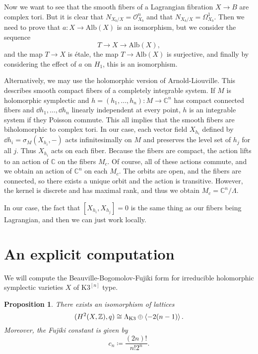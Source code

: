 \documentclass[leqno, openany]{memoir}
\newtheorem{prop}[thm]{Proposition}
\theoremstyle{definition}
\theoremstyle{remark}
\theoremstyle{plain}
\theoremstyle{definition}
\theoremstyle{remark}
\newcommand{\C}{\mathbb{C}}
\newcommand{\Z}{\mathbb{Z}}
\newcommand{\mc}[1]{\mathcal{#1}}
\newcommand{\mr}[1]{\mathrm{#1}}
\begin{document}
Now we want to see that the smooth fibers of a Lagrangian fibration $X \to B$ are complex tori. But it is clear that $N_{X_b/X} = \mc{O}_{X_b}^n$ and that $N_{X_b/X} = \Omega^1_{X_b}$. Then we need to prove that $a \colon X \to \mr{Alb}(X)$ is an isomorphism, but we consider the sequence
\[ T \to X \to \mr{Alb}(X), \]
and the map $T \to X$ is \'etale, the map $T \to \mr{Alb}(X)$ is surjective, and finally by considering the effect of $a$ on $H_1$, this is an isomorphism.

Alternatively, we may use the holomorphic version of Arnold-Liouville. This describes smooth compact fibers of a completely integrable system. If $M$ is holomorphic symplectic and $h = (h_1, \ldots, h_n) \colon M \to \C^n$ has compact connected fibers and $\dd{h_1}, \ldots, \dd{h_n}$ linearly independent at every point, $h$ is an integrable system if they Poisson commute. This all implies that the smooth fibers are biholomorphic to complex tori. In our case, each vector field $X_{h_i}$ defined by $\dd{h_i} = \sigma_M(X_{h_i}, -)$ acts infinitesimally on $M$ and preserves the level set of $h_{j}$ for all $j$. Thus $X_{h_i}$ acts on each fiber. Because the fibers are compact, the action lifts to an action of $\C$ on the fibers $M_c$. Of course, all of these actions commute, and we obtain an action of $\C^n$ on each $M_c$. The orbits are open, and the fibers are connected, so there exists a unique orbit and the action is transitive. However, the kernel is discrete and has maximal rank, and thus we obtain $M_c = \C^n / \Lambda$.

In our case, the fact that $[X_{h_i}, X_{h_j}] = 0$ is the same thing as our fibers being Lagrangian, and then we can just work locally.

\section{An explicit computation}%
\label{sec:an_explicit_computation}

We will compute the Beauville-Bogomolov-Fujiki form for irreducible holomorphic symplectic varieties $X$ of $\mr{K3}^{[n]}$ type.

\begin{prop}
    There exists an isomorphism of lattices
    \[ (H^2(X, \Z), q) \cong \Lambda_{\mr{K3}} \oplus \ev{-2(n-1)}. \]
    Moreover, the Fujiki constant is given by 
    \[ c_n \coloneqq \frac{(2n)!}{n!2^n}. \]
\end{prop}
\end{document}
